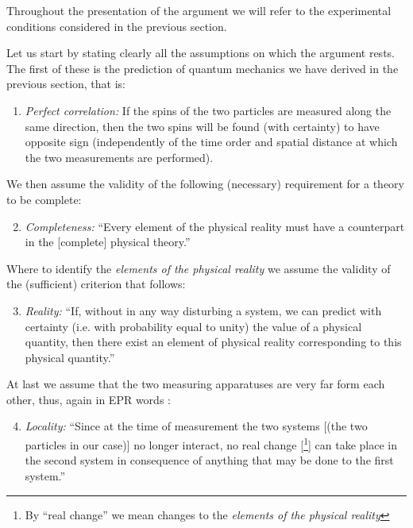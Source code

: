 \begin{note}
Throughout the presentation of the argument we will refer to the experimental conditions considered in the previous section.
\end{note}

Let us start by stating clearly all the assumptions on which the argument rests. The first of these is the prediction of quantum mechanics we have derived in the previous section, that is:
\begin{enumerate}
  \renewcommand{\theenumi}{\alph{enumi}}
  \renewcommand{\labelenumi}{(\theenumi)}
\item \label{itm:epr-perfect-correlation} \textit{Perfect correlation:} If the spins of the two particles are measured along the same direction, then the two spins will be found (with certainty) to have opposite sign (independently of the time order and spatial distance at which the two measurements are performed).
\end{enumerate}
We then assume the validity of the following (necessary) requirement for a theory to be complete:
\begin{enumerate}
  \setcounter{enumi}{1}
  \renewcommand{\theenumi}{\alph{enumi}}
  \renewcommand{\labelenumi}{(\theenumi)}
\item \label{itm:epr-completeness} \textit{Completeness:} ``Every element of the physical reality must have a counterpart in the [complete] physical theory.'' \cite{PhysRev.47.777}
\end{enumerate}
Where to identify the \textit{elements of the physical reality} we assume the validity of the (sufficient) criterion that follows:
\begin{enumerate}
  \setcounter{enumi}{2}
  \renewcommand{\theenumi}{\alph{enumi}}
  \renewcommand{\labelenumi}{(\theenumi)}
\item \label{itm:epr-reality} \textit{Reality:} ``If, without in any way disturbing a system, we can predict with certainty (i.e. with probability equal to unity) the value of a physical quantity, then there exist an element of physical reality corresponding to this physical quantity.'' \cite{PhysRev.47.777}
\end{enumerate}
At last we assume that the two measuring apparatuses are very far form each other, thus, again in EPR words \cite{PhysRev.47.777}:
\begin{enumerate}
  \setcounter{enumi}{3}
  \renewcommand{\theenumi}{\alph{enumi}}
  \renewcommand{\labelenumi}{(\theenumi)}
\item \label{itm:epr-locality} \textit{Locality:} ``Since at the time of measurement the two systems [(the two particles in our case)] no longer interact, no real change [\footnote{By ``real change'' we mean changes to the \textit{elements of the physical reality}}] can take place in the second system in consequence of anything that may be done to the first system.''
\end{enumerate}

